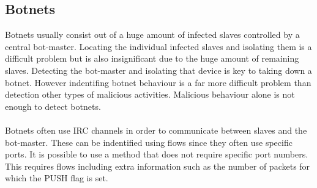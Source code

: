 \subsection{Botnets}
Botnets usually consist out of a huge amount of infected slaves controlled by a central bot-master. Locating the individual infected slaves and isolating them is a difficult problem but is also insignificant due to the huge amount of remaining slaves. Detecting the bot-master and isolating that device is key to taking down a botnet. However indentifing botnet behaviour is a far more difficult problem than detection other types of malicious activities. \cite{zhu2008botnet} Malicious behaviour alone is not enough to detect botnets. \\
\\
Botnets often use IRC channels in order to communicate between slaves and the bot-master. These can be indentified using flows since they often use specific ports. It is possible to use a method that does not require specific port numbers. This requires flows including extra information such as the number of packets for which the PUSH flag is set.  


